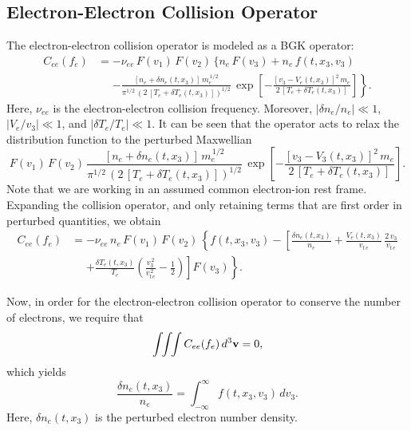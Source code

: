\documentclass[12pt,prb,aps]{revtex4-1}
\begin{document}
\subsection{Electron-Electron Collision Operator}\label{see}
The electron-electron collision operator is modeled as a BGK operator:\,\cite{haz,krook}
\begin{align}
C_{ee}(f_e) &= -\nu_{ee}\,F(v_1)\,F(v_2)\,\biggr\{n_e\,F(v_3)+n_e\,f(t,x_3,v_3)\phantom{\frac{a}{b}}\nonumber\\[0.5ex]
&\phantom{=}\left.- \frac{[n_e+\delta n_e(t,x_3)]\,m_e^{\,1/2}}{\pi^{1/2}\,(2\,[T_e+\delta T_e(t,x_3)])^{1/2}}\,\exp\left[-\frac{[v_3-V_e(t,x_3)]^{2}\,m_e}{2\,[T_e+\delta T_e(t,x_3)]}\right]\right\}.
\end{align}
Here, $\nu_{ee}$ is the electron-electron collision frequency. Moreover, $|\delta n_e/n_e|\ll 1$, $|V_e/v_3|\ll 1$,  and $|\delta T_e/T_e|\ll 1$. It can be seen that the operator acts to relax the distribution function to the 
perturbed Maxwellian
\begin{equation}
F(v_1)\,F(v_2)\,\frac{[n_e+\delta n_e(t,x_3)]\,m_e^{\,1/2}}{\pi^{1/2}\,(2\,[T_e+\delta T_e(t,x_3)])^{1/2}}\,\exp\left[-\frac{[v_3-V_3(t,x_3)]^{2}\,m_e}{2\,[T_e+\delta T_e(t,x_3)]}\right].
\end{equation}
Note that we are working in an assumed common electron-ion rest frame.
Expanding the collision operator, and only retaining terms that are first order in perturbed quantities, we obtain
\begin{align}\label{e24}
C_{ee}(f_e) &=- \nu_{ee}\,n_e\,F(v_1)\,F(v_2)\,\left\{ f(t,x_3,v_3) - \left[\frac{\delta n_e(t,x_3)}{n_e} +\frac{V_e(t,x_3)}{v_{t\,e}} \,\frac{2\,v_3}{v_{t\,e}}\right.\right.\nonumber\\[0.5ex]
&\phantom{=}\left.\left.+\frac{\delta T_e(t,x_3)}{T_e}\left(\frac{v_3^{\,2}}{v_{t\,e}^{\,2}}-\frac{1}{2}\right)\right]F(v_3)\right\}.
\end{align}

Now, in order for the electron-electron collision operator to conserve the number of electrons, we require that
\begin{equation}
\int\!\!\int\!\!\int C_{ee}(f_e) \,d^3{\bf v} = 0,
\end{equation}
which yields
\begin{equation}\label{dne}
\frac{\delta n_e(t,x_3)}{n_e} =\int_{-\infty}^\infty f(t,x_3,v_3)\,dv_3.
\end{equation}
Here, $\delta n_e(t,x_3)$ is the perturbed electron number density. 
\end{document}
